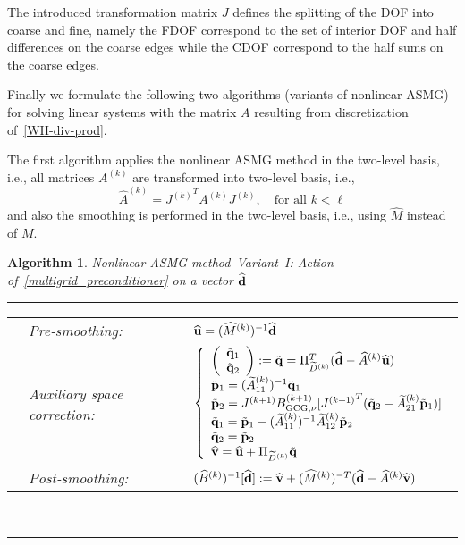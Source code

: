 \documentclass[11pt]{amsart}
\numberwithin{equation}{section}
\newtheorem{algorithm}{Algorithm}[section]
\theoremstyle{definition}\newtheorem{example}{Example}[section]
\begin{document}
The introduced transformation matrix $J$ defines the splitting of the DOF into coarse and fine, namely 
the FDOF correspond to the set of interior DOF and half differences on the coarse edges while the 
CDOF correspond to the half sums on the coarse edges.

Finally we formulate the following two algorithms (variants of nonlinear ASMG)
for solving linear systems with the matrix $A$ resulting from discretization
of~\eqref{WH-div-prod}.

The first algorithm applies the nonlinear ASMG method in the two-level basis, i.e.,
all matrices $A^{(k)}$ are transformed into two-level basis, i.e.,
$$\widehat{A}^{(k)}={J^{(k)}}^T A^{(k)} J^{(k)}, \quad \mbox{for all } k<\ell$$
and also the smoothing is performed in the two-level basis, i.e., using $\widehat{M}$
instead of $M$. 

\begin{algorithm}{Nonlinear ASMG method--Variant~I: Action of~\eqref{multigrid_preconditioner}
on a vector $\widehat{{{\bf{{d}}}}}$}\label{algorithm1} \\[-1ex]
\hrule \vspace{1ex}
\begin{tabular}{lll}
& Pre-smoothing: & $\widehat{{{\bf{{u}}}}} = (\widehat{M}^{(k)})^{-1} \widehat{{{\bf{{d}}}}}$ \\
& Auxiliary space correction: & $\left\{
\begin{array}{l}
\left(\begin{array}{c} \tilde{{{\bf{{q}}}}}_1 \\ \tilde{{{\bf{{q}}}}}_2 \end{array}\right)
:=\tilde{{{\bf{{q}}}}} = \Pi_{\widetilde{D}^{(k)}}^T (\widehat{{{\bf{{d}}}}} - \widehat{A}^{(k)}
\widehat{{{\bf{{u}}}}}) \\
\tilde{{{\bf{{p}}}}}_1 = (\widetilde{A}^{(k)}_{11})^{-1} \tilde{{{\bf{{q}}}}}_1 \\
\tilde{{{\bf{{p}}}}}_2 ={J^{(k+1)}}
B^{(k+1)}_{{\rm GCG,\nu}}[{J^{(k+1)}}^T (\tilde{{{\bf{{q}}}}}_2 -  \widetilde{A}^{(k)}_{21} \tilde{{{\bf{{p}}}}}_1)] \\
\tilde{{{\bf{{q}}}}}_1 = \tilde{{{\bf{{p}}}}}_1 - (\widetilde{A}^{(k)}_{11})^{-1} \widetilde{A}^{(k)}_{12} \tilde{{{\bf{{p}}}}}_2 \\
\tilde{{{\bf{{q}}}}}_2 = \tilde{{{\bf{{p}}}}}_2 \\
\widehat{{{\bf{{v}}}}} = \widehat{{{\bf{{u}}}}} + \Pi_{\widetilde{D}^{(k)}} \tilde{{{\bf{{q}}}}}
\end{array} \right.$ \\
& Post-smoothing: & $(\widehat{B}^{(k)})^{-1}[\widehat{{{\bf{{d}}}}}] :=
\widehat{{{\bf{{v}}}}} + (\widehat{M}^{(k)})^{-T} (\widehat{{{\bf{{d}}}}} - \widehat{A}^{(k)}
\widehat{{{\bf{{v}}}}})$
\end{tabular}
\\[1ex]
\hrule
\end{algorithm}
\end{document}
